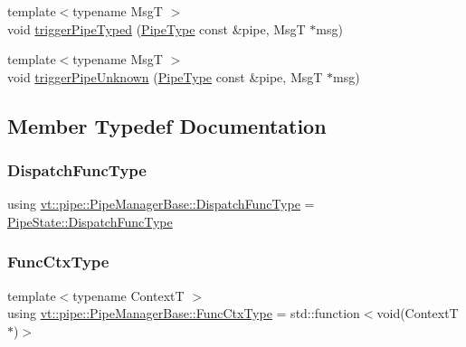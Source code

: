 \begin{DoxyCompactItemize}
\item 
{\footnotesize template$<$typename MsgT $>$ }\\void \hyperlink{structvt_1_1pipe_1_1_pipe_manager_base_a18038800a9665e59944db577325a3f76}{trigger\+Pipe\+Typed} (\hyperlink{namespacevt_ac9852acda74d1896f48f406cd72c7bd3}{Pipe\+Type} const \&pipe, MsgT $\ast$msg)
\item 
{\footnotesize template$<$typename MsgT $>$ }\\void \hyperlink{structvt_1_1pipe_1_1_pipe_manager_base_af796769ead9441e58e20ee9d43b2a313}{trigger\+Pipe\+Unknown} (\hyperlink{namespacevt_ac9852acda74d1896f48f406cd72c7bd3}{Pipe\+Type} const \&pipe, MsgT $\ast$msg)
\end{DoxyCompactItemize}


\subsection{Member Typedef Documentation}
\mbox{\label{structvt_1_1pipe_1_1_pipe_manager_base_a983e301505317c5ba2041461e7dec84a}} 
\subsubsection{\texorpdfstring{Dispatch\+Func\+Type}{DispatchFuncType}}
{\footnotesize\ttfamily using \hyperlink{structvt_1_1pipe_1_1_pipe_manager_base_a983e301505317c5ba2041461e7dec84a}{vt\+::pipe\+::\+Pipe\+Manager\+Base\+::\+Dispatch\+Func\+Type} =  \hyperlink{structvt_1_1pipe_1_1_pipe_state_aa6d3f6b8d9c1a4d1f261bc563ff99e3e}{Pipe\+State\+::\+Dispatch\+Func\+Type}}

\mbox{\label{structvt_1_1pipe_1_1_pipe_manager_base_ad8463823b6b4cfdb67c119d6d22e3bac}} 
\subsubsection{\texorpdfstring{Func\+Ctx\+Type}{FuncCtxType}}
{\footnotesize\ttfamily template$<$typename ContextT $>$ \\
using \hyperlink{structvt_1_1pipe_1_1_pipe_manager_base_ad8463823b6b4cfdb67c119d6d22e3bac}{vt\+::pipe\+::\+Pipe\+Manager\+Base\+::\+Func\+Ctx\+Type} =  std\+::function$<$void(ContextT$\ast$)$>$}

